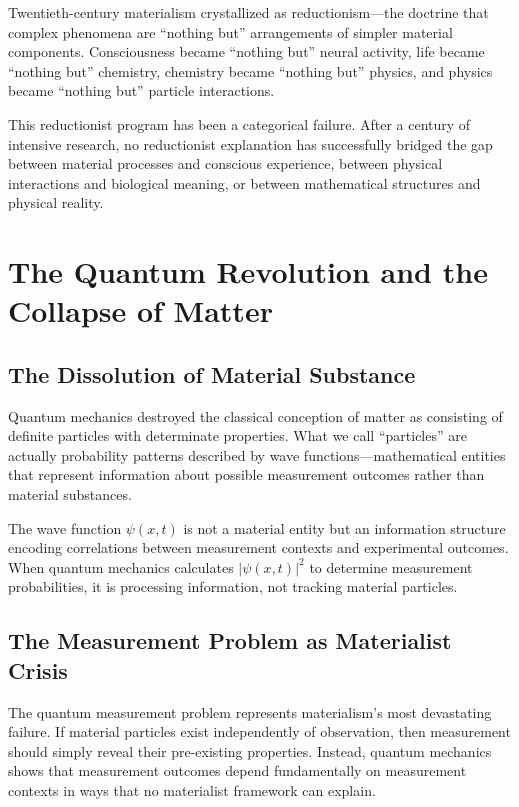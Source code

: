 \documentclass[12pt]{article}
\begin{document}
Twentieth-century materialism crystallized as reductionism—the doctrine that complex phenomena are ``nothing but'' arrangements of simpler material components. Consciousness became ``nothing but'' neural activity, life became ``nothing but'' chemistry, chemistry became ``nothing but'' physics, and physics became ``nothing but'' particle interactions.

This reductionist program has been a categorical failure. After a century of intensive research, no reductionist explanation has successfully bridged the gap between material processes and conscious experience, between physical interactions and biological meaning, or between mathematical structures and physical reality.

\section{The Quantum Revolution and the Collapse of Matter}

\subsection{The Dissolution of Material Substance}

Quantum mechanics destroyed the classical conception of matter as consisting of definite particles with determinate properties. What we call ``particles'' are actually probability patterns described by wave functions—mathematical entities that represent information about possible measurement outcomes rather than material substances.

The wave function $\psi(x,t)$ is not a material entity but an information structure encoding correlations between measurement contexts and experimental outcomes. When quantum mechanics calculates $|\psi(x,t)|^2$ to determine measurement probabilities, it is processing information, not tracking material particles.

\subsection{The Measurement Problem as Materialist Crisis}

The quantum measurement problem represents materialism's most devastating failure. If material particles exist independently of observation, then measurement should simply reveal their pre-existing properties. Instead, quantum mechanics shows that measurement outcomes depend fundamentally on measurement contexts in ways that no materialist framework can explain.
\end{document}
